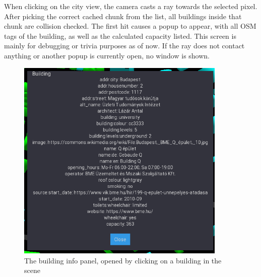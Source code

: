 When clicking on the city view, the camera casts a ray towards the selected pixel. After picking the correct cached chunk from the list, all buildings inside that chunk are collision checked. The first hit causes a popup to appear, with all OSM tags of the building, as well as the calculated capacity listed. This screen is mainly for debugging or trivia purposes as of now. If the ray does not contact anything or another popup is currently open, no window is shown.

\begin{figure}[!ht]
    \centering
    \includegraphics[width=100mm, keepaspectratio]{images/building-popup.png}
    \caption{The building info panel, opened by clicking on a building in the scene}
\end{figure}